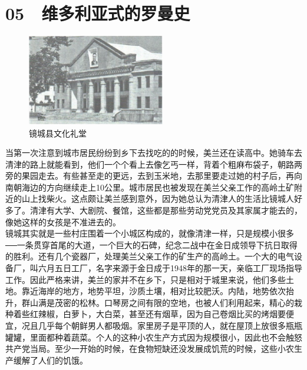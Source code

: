 \fancyhead[RO]{\thepage}
\fancyhead[LE]{\thepage}
\fancyfoot[LE,RO]{}
\fancyfoot[LO,CE]{}
\fancyfoot[CO,RE]{}
\chapter*{05 {\FA } 维多利亚式的罗曼史}
\begin{figure}[!htbp]
	\centering
	\includegraphics[width=6cm]{./Chapters/Images/05.jpg}
	\caption*{镜城县文化礼堂}
\end{figure}


当第一次注意到城市居民纷纷到乡下去找吃的的时候，美兰还在读高中。她骑车去清津的路上就能看到，他们一个个看上去像乞丐一样，背着个粗麻布袋子，朝路两旁的果园走去。有些甚至走的更远，去到玉米地，去那里要走过她的村子后，再向南朝海边的方向继续走上10公里。城市居民也被发现在美兰父亲工作的高岭土矿附近的山上找柴火。这点颇让美兰感到意外，因为她总认为清津人的生活比镜城人好多了。清津有大学、大剧院、餐馆，这些都是那些劳动党党员及其家属才能去的，像她这样的女孩是不准进去的。\\

镜城其实就是一些村庄围着一个小城区构成的，就像清津一样，只是规模小很多──一条贯穿首尾的大道，一个巨大的石碑，纪念二战中在金日成领导下抗日取得的胜利。还有几个瓷器厂，处理美兰父亲工作的矿生产的高岭土。一个大的电气设备厂，叫六月五日工厂，名字来源于金日成于1948年的那一天，亲临工厂现场指导工作。因此严格来讲，美兰的家并不在乡下，只是相对于城里来说，他们多些土地。靠近海岸的地方，地势平坦，沙质土壤，相对比较肥沃。内陆，地势依次抬升，群山满是茂密的松林。口琴房之间有限的空地，也被人们利用起来，精心的栽种着些红辣椒，白萝卜，大白菜，甚至还有烟草，因为自己卷烟比买的烤烟要便宜，况且几乎每个朝鲜男人都吸烟。家里房子是平顶的人，就在屋顶上放很多瓶瓶罐罐，里面都种着蔬菜。个人的这种小农生产方式因为规模很小，因此也不会触怒共产党当局。至少一开始的时候，在食物短缺还没发展成饥荒的时候，这些小农生产缓解了人们的饥饿。\\

